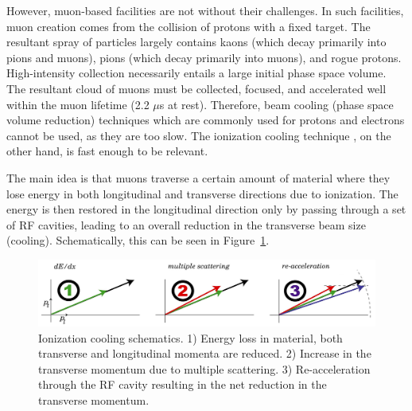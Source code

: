 \documentclass[a4paper,11pt]{article}
\begin{document}
However, muon-based facilities are not without their challenges. In such facilities, muon creation comes from the collision of protons with a fixed target. The resultant spray of particles largely contains kaons (which decay primarily into pions and muons), pions (which decay primarily into muons), and rogue protons. High-intensity collection necessarily entails a large initial phase space volume. The resultant cloud of muons must be collected, focused, and accelerated well within the muon lifetime (2.2 $\mu$s at rest). Therefore, beam cooling (phase space volume reduction) techniques which are commonly used for protons and electrons cannot be used, as they are too slow. The ionization cooling technique \cite{Parkhomchuk}, on the other hand, is fast enough to be relevant. 




\iffalse
The main idea is that muons traverse a certain amount of material where they lose energy in both longitudinal and transverse directions due to ionization. The energy is then restored in the longitudinal direction only by passing through a set of RF cavities, leading to an overall reduction in the transverse beam size (cooling). Schematically, this can be seen in Figure~\ref{fig:cooling_vector}.

\begin{figure}[htb] 
\centering
\includegraphics[width=\columnwidth]{Figures/cooling_vector}
\caption{Ionization cooling schematics. 1) Energy loss in material, both transverse and longitudinal momenta are reduced. 2) Increase in the transverse momentum due to multiple scattering.  3) Re-acceleration through the RF cavity resulting in the net reduction in the transverse momentum.}
\label{fig:cooling_vector}
\end{figure}
\end{document}

